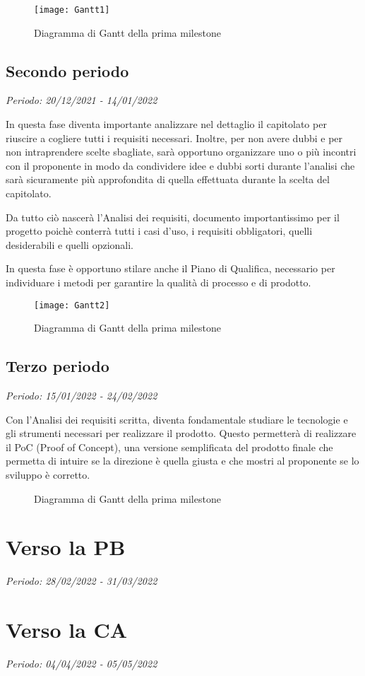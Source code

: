 \begin{figure}[!ht]
    \texttt{[image: Gantt1]}
    \caption{Diagramma di Gantt della prima milestone} 
\end{figure}

\subsection{Secondo periodo}

\textit{Periodo: 20/12/2021 - 14/01/2022}

In questa fase diventa importante analizzare nel dettaglio il capitolato per riuscire a
cogliere tutti i requisiti necessari. Inoltre, per non avere dubbi e per non intraprendere
scelte sbagliate, sarà opportuno organizzare uno o più incontri con il proponente in modo da
condividere idee e dubbi sorti durante l'analisi che sarà sicuramente più approfondita di quella
effettuata durante la scelta del capitolato.
\par Da tutto ciò nascerà l'Analisi dei requisiti, documento importantissimo per il progetto poichè
conterrà tutti i casi d'uso, i requisiti obbligatori, quelli desiderabili e quelli opzionali.
\par In questa fase è opportuno stilare anche il Piano di Qualifica, necessario per individuare
i metodi per garantire la qualità di processo e di prodotto.

\begin{figure}[!ht]
    \texttt{[image: Gantt2]}
    \caption{Diagramma di Gantt della prima milestone} 
\end{figure}

\subsection{Terzo periodo}

\textit{Periodo: 15/01/2022 - 24/02/2022}

Con l'Analisi dei requisiti scritta, diventa fondamentale studiare le tecnologie e gli strumenti necessari
per realizzare il prodotto. Questo permetterà di realizzare il PoC (Proof of Concept), una versione semplificata 
del prodotto finale che permetta di intuire se la direzione è quella giusta e che mostri al proponente se lo 
sviluppo è corretto.

\begin{figure}[!ht]
    \caption{Diagramma di Gantt della prima milestone} 
\end{figure}

\section{Verso la PB}

\textit{Periodo: 28/02/2022 - 31/03/2022}

\section{Verso la CA}

\textit{Periodo: 04/04/2022 - 05/05/2022}